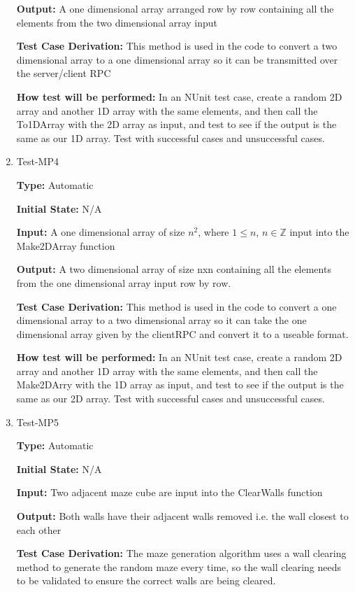 \documentclass[12pt, titlepage]{article}
\begin{document}
\begin{enumerate}
 \textbf{Output:} A one dimensional array arranged row by row containing all the elements from the two dimensional array input

 \textbf{Test Case Derivation:} This method is used in the code to convert a two dimensional array to a one dimensional array so it can be transmitted over the server/client RPC

 \textbf{How test will be performed:} In an NUnit test case, create a random 2D array and another 1D array with the same elements, and then call the To1DArray with the 2D array as input, and test to see if the output is the same as our 1D array. Test with successful cases and unsuccessful cases.

 \item{Test-MP4\\}

 \textbf{Type:} Automatic
					
 \textbf{Initial State:} N/A
					
 \textbf{Input:}  A one dimensional array of size $n^2$, where $1\leq n$, $n\in \mathbb{Z}$ input into the Make2DArray function
					
 \textbf{Output:} A two dimensional array of size nxn containing all the elements from the one dimensional array input row by row.

 \textbf{Test Case Derivation:} This method is used in the code to convert a one dimensional array to a two dimensional array so it can take the one dimensional array given by the clientRPC and convert it to a useable format. 

 \textbf{How test will be performed:} In an NUnit test case, create a random 2D array and another 1D array with the same elements, and then call the Make2DArry with the 1D array as input, and test to see if the output is the same as our 2D array. Test with successful cases and unsuccessful cases.

 \item{Test-MP5\\}

 \textbf{Type:} Automatic
					
 \textbf{Initial State:} N/A
					
 \textbf{Input:}  Two adjacent maze cube are input into the ClearWalls function
					
 \textbf{Output:} Both walls have their adjacent walls removed i.e. the wall closest to each other

 \textbf{Test Case Derivation:} The maze generation algorithm uses a wall clearing method to generate the random maze every time, so the wall clearing needs to be validated to ensure the correct walls are being cleared. 


\end{enumerate}
\end{document}
